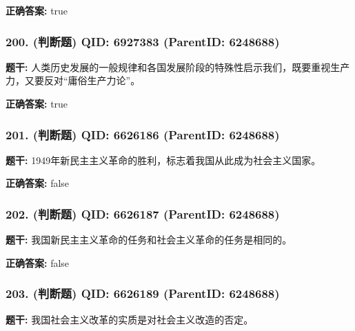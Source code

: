 \documentclass[12pt,UTF8]{ctexart}
\begin{document}
\textbf{正确答案:}
true

\vspace{0.3em}\hrulefill\vspace{0.7em}

\subsubsection*{200. (判断题) \small QID: 6927383 (ParentID: 6248688)}

\textbf{题干:}
人类历史发展的一般规律和各国发展阶段的特殊性启示我们，既要重视生产力，又要反对“庸俗生产力论”。



\textbf{正确答案:}
true

\vspace{0.3em}\hrulefill\vspace{0.7em}

\subsubsection*{201. (判断题) \small QID: 6626186 (ParentID: 6248688)}

\textbf{题干:}
1949年新民主主义革命的胜利，标志着我国从此成为社会主义国家。



\textbf{正确答案:}
false

\vspace{0.3em}\hrulefill\vspace{0.7em}

\subsubsection*{202. (判断题) \small QID: 6626187 (ParentID: 6248688)}

\textbf{题干:}
我国新民主主义革命的任务和社会主义革命的任务是相同的。



\textbf{正确答案:}
false

\vspace{0.3em}\hrulefill\vspace{0.7em}

\subsubsection*{203. (判断题) \small QID: 6626189 (ParentID: 6248688)}

\textbf{题干:}
我国社会主义改革的实质是对社会主义改造的否定。
\end{document}
